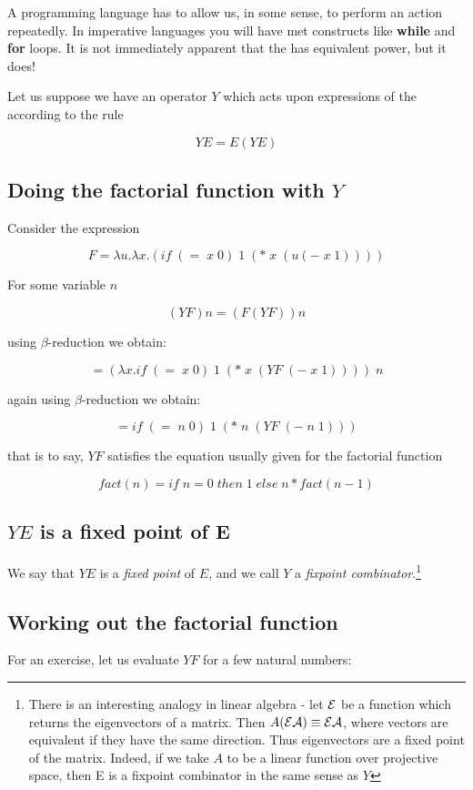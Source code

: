 A programming language has to allow us, in some sense, to perform an action
repeatedly. In imperative languages you will have met constructs like {\bf
while} and {\bf for} loops. It is not immediately apparent that the \LC has
equivalent power, but it does!

Let us suppose we have an operator $Y$ which acts upon expressions of the
\LC according to the rule

$$YE = E(YE)$$

\subsection{Doing the factorial function with $Y$}

Consider the expression

$$F =  \lambda u. \lambda x. (if\;(=\;x\;0)\;1\;(*\;x\;(u(-\;x\;1))))$$

For some variable $n$

$$(YF) n = (F(YF)) n$$

using $\beta$-reduction we obtain:

$$ = (\lambda x. if\;(=\;x\;0)\;1\;(*\;x\;(YF\;(-\;x\;1))))\;n$$


again using $\beta$-reduction we obtain:

$$ = if\;(=\;n\;0)\;1\;(*\;n\;(YF\;(-\;n\;1)))$$

that is to say, $YF$ satisfies the equation usually given for the factorial
function

$$fact(n) = if\; n=0\; then\; 1\; else\; n*fact(n-1)$$

\subsection{$YE$ is a fixed point of E}

We say that $YE$  is a {\em  fixed point} of  $E$, and we  call $Y$ a  {\em
fixpoint combinator}.\footnote{There is  an interesting  analogy in  linear
algebra - let $\cal  E$ be a function  which returns the eigenvectors  of a
matrix. Then $A(\cal E A) \equiv \cal E A$, where vectors are equivalent  if
they have the  same direction. Thus  eigenvectors are a  fixed point of
the matrix. Indeed, if we take $A$ to  be a linear function over
projective space, then \cal E is a fixpoint combinator in the same sense as
$Y$}


\subsection{Working out the factorial function}
For an exercise, let us evaluate $YF$ for a few natural numbers:

